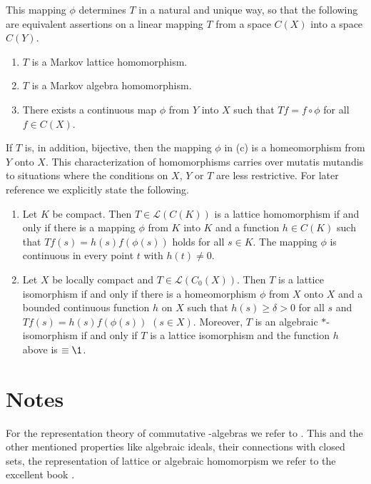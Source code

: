 This mapping $\phi$ determines $T$ in a natural and unique way, so that the following are equivalent assertions on a linear mapping $T$ from a space $C(X)$ into a space $C(Y)$.
\begin{enumerate}[\upshape (a)]
\item 
	$T$ is a Markov lattice homomorphism.
\item 
	$T$ is a Markov algebra homomorphism.
\item 
	There exists a continuous map $\phi$ from $Y$ into $X$ such that $Tf = f \circ \phi$ for all $f \in 	C(X)$.
\end{enumerate}
If $T$ is, in addition, bijective, then the mapping $\phi$ in (c) is a homeomorphism from $Y$ onto $X$.
This characterization of homomorphisms carries over mutatis mutandis to situations where the conditions on $X$, $Y$ or $T$ are less restrictive.
For later reference we explicitly state the following.
\begin{enumerate}[\upshape (i), wide, labelindent=.5em]
\item 
	Let $K$ be compact. Then $ T \in \mathcal{L}(C(K)) $ is a lattice homomorphism if and only if there is a mapping 
$\phi$ from $K$ into $K$ and a function $h \in C(K)$ such that $Tf(s) = h(s)f(\phi(s))$ holds for all $s \in K$.
The mapping $\phi$ is continuous in every point $t$ with $h(t) \neq 0$.

\item 
	Let $X$ be locally compact and $T \in \mathcal{L}(C_{0}(X))$.
Then $T$ is a lattice isomorphism if and only if there is a homeomorphism $\phi$ from $X$ onto $X$ and a bounded continuous function $h$ on $X$ such that $h(s) \geq \delta > 0$ for all $s$ and $Tf(s) = h(s)f(\phi(s))$ $(s \in X)$.
Moreover, $T$ is an algebraic $*$-isomorphism if and only if $T$ is a lattice isomorphism and the function $h$ above is $\equiv \1$.
\end{enumerate}

\section*{Notes}

For the representation theory of commutative \CA-algebras we refer to \citet{takesaki:1979}. 
This and the other mentioned properties like algebraic ideals, their connections with closed sets, the representation of lattice or algebraic homomorpism \etc we refer to the excellent book \citet{semadeni:1971}.


\RaggedRight

 
